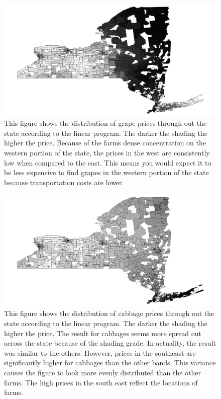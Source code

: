 \documentclass{report}
\begin{document}
\begin{figure}
\centering
\begin{framed}
\includegraphics[scale=.50]{prices_69}
\caption{This figure shows the distribution of grape prices through out the state according to the linear program. The darker the shading the higher the price. Because of the farms dense concentration on the western portion of the state, the prices in the west are consistently low when compared to the east. This means you would expect it to be less expensive to find grapes in the western portion of the state because transportation costs are lower.}
\label{fig:prices_69}
\end{framed}
\end{figure}


\begin{figure}
\centering
\begin{framed}
\includegraphics[scale=.50]{prices_243}
\caption{This figure shows the distribution of cabbage prices through out the state according to the linear program. The darker the shading the higher the price. The result for cabbages seems more spread out across the state because of the shading grade. In actuality, the result was similar to the others. However, prices in the southeast are significantly higher for cabbages than the other bands. This variance causes the figure to look more evenly distributed than the other farms. The high prices in the south east reflect the locations of farms.}
\label{fig:prices_243}
\end{framed}
\end{figure}
\end{document}

